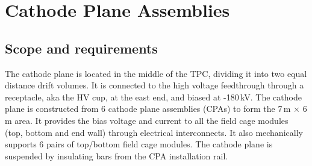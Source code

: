 


\section{Cathode Plane Assemblies}
\label{sec:cpa}

\subsection{Scope and requirements}

The cathode plane is located in the middle of the TPC, dividing it into two equal distance drift volumes.  It is connected to the high voltage feedthrough through a receptacle, aka the HV cup, at the east end, and biased at -180\,kV.  The cathode plane is constructed from 6 cathode plane assemblies (CPAs) to form the 7\,m $\times$ 6\,m area.  It provides the bias voltage and current to all the field cage modules (top, bottom and end wall) through electrical interconnects.  It also mechanically supports 6 pairs of top/bottom field cage modules.
The cathode plane is suspended by insulating bars from the CPA installation rail.


